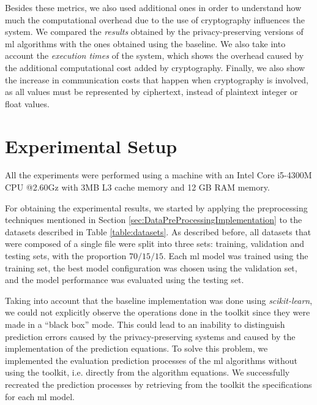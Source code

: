 Besides these metrics, we also used additional ones in order to understand how much the computational overhead due to the use of cryptography influences the system.
We compared the \emph{results} obtained by the privacy-preserving versions of \ac{ml} algorithms with the ones obtained using the baseline. We also take into account the \emph{execution times} of the system, which shows the overhead caused by the additional computational cost added by cryptography.
Finally, we also show the increase in communication costs that happen when cryptography is involved, as all values must be represented by ciphertext, instead of plaintext integer or float values.


\section{Experimental Setup}
\label{sec:ExperimentalSetup}

All the experiments were performed using a machine with an Intel Core i5-4300M CPU @2.60Gz with 3MB L3 cache memory and 12 GB RAM memory.

For obtaining the experimental results, we started by applying the preprocessing techniques mentioned in Section \ref{sec:DataPreProcessingImplementation} to the datasets described in Table \ref{table:datasets}. As described before, all datasets that were composed of a single file were split into three sets: training, validation and testing sets, with the proportion $70/15/15$. Each \ac{ml} model was trained using the training set, the best model configuration was chosen using the validation set, and the model performance was evaluated using the testing set.

Taking into account that the baseline implementation was done using \textit{scikit-learn}, we could not explicitly observe the operations done in the toolkit since they were made in a ``black box'' mode. This could lead to an inability to distinguish prediction errors caused by the privacy-preserving systems and caused by the implementation of the prediction equations. To solve this problem, we implemented the evaluation prediction processes of the \ac{ml} algorithms without using the toolkit, i.e. directly from the algorithm equations.
We successfully recreated the prediction processes by retrieving from the toolkit the specifications for each \ac{ml} model.

